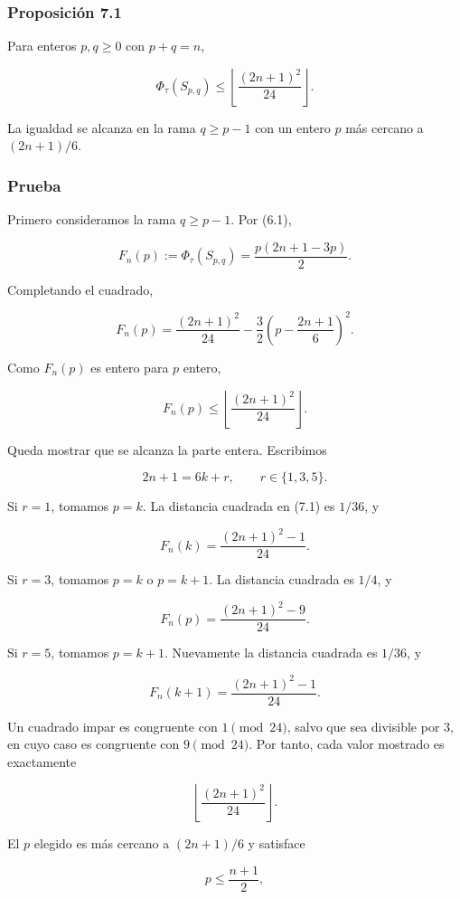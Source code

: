 \documentclass[
  11pt,
]{article}
\begin{document}
\subsubsection{Proposición 7.1}\label{proposiciuxf3n-7.1}

Para enteros \(p,q\ge0\) con \(p+q=n\),

\[
\Phi_\tau(S_{p,q})
\le
\left\lfloor\frac{(2n+1)^2}{24}\right\rfloor.
\]

La igualdad se alcanza en la rama \(q\ge p-1\) con un entero \(p\) más
cercano a \((2n+1)/6\).

\subsubsection{Prueba}\label{prueba-11}

Primero consideramos la rama \(q\ge p-1\). Por (6.1),

\[
F_n(p)
:=
\Phi_\tau(S_{p,q})
=
\frac{p(2n+1-3p)}2.
\]

Completando el cuadrado,

\[
F_n(p)
=
\frac{(2n+1)^2}{24}
-
\frac32
\left(
p-\frac{2n+1}{6}
\right)^2.
\tag{7.1}
\]

Como \(F_n(p)\) es entero para \(p\) entero,

\[
F_n(p)
\le
\left\lfloor\frac{(2n+1)^2}{24}\right\rfloor.
\]

Queda mostrar que se alcanza la parte entera. Escribimos

\[
2n+1=6k+r,
\qquad
r\in\{1,3,5\}.
\]

Si \(r=1\), tomamos \(p=k\). La distancia cuadrada en (7.1) es \(1/36\),
y

\[
F_n(k)
=
\frac{(2n+1)^2-1}{24}.
\]

Si \(r=3\), tomamos \(p=k\) o \(p=k+1\). La distancia cuadrada es
\(1/4\), y

\[
F_n(p)
=
\frac{(2n+1)^2-9}{24}.
\]

Si \(r=5\), tomamos \(p=k+1\). Nuevamente la distancia cuadrada es
\(1/36\), y

\[
F_n(k+1)
=
\frac{(2n+1)^2-1}{24}.
\]

Un cuadrado impar es congruente con \(1\pmod{24}\), salvo que sea
divisible por \(3\), en cuyo caso es congruente con \(9\pmod{24}\). Por
tanto, cada valor mostrado es exactamente

\[
\left\lfloor\frac{(2n+1)^2}{24}\right\rfloor.
\]

El \(p\) elegido es más cercano a \((2n+1)/6\) y satisface

\[
p\le\frac{n+1}{2},
\]
\end{document}

